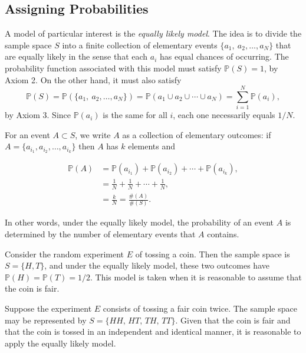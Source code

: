 \documentclass[]{book}
\numberwithin{equation}{chapter}
\numberwithin{figure}{chapter}
\theoremstyle{plain}
\theoremstyle{definition}
\theoremstyle{remark}
\theoremstyle{definition}
\theoremstyle{definition}
\theoremstyle{remark}
\let\BeginKnitrBlock\begin \let\EndKnitrBlock\end
\begin{document}
\subsection{Assigning Probabilities}\label{assigning-probabilities}

A model of particular interest is the \emph{equally likely model}. The
idea is to divide the sample space \(S\) into a finite collection of
elementary events \(\{ a_{1},\ a_{2}, \ldots, a_{N} \}\) that are
equally likely in the sense that each \(a_{i}\) has equal chances of
occurring. The probability function associated with this model must
satisfy \(\mathbb{P}(S)=1\), by Axiom 2. On the other hand, it must also
satisfy \[ \mathbb{P}(S)=\mathbb{P}( \{ a_{1},\
a_{2},\ldots,a_{N} \} )=\mathbb{P}(a_{1}\cup a_{2}\cup\cdots\cup
a_{N})=\sum_{i=1}^{N}\mathbb{P}(a_{i}), \] by Axiom 3. Since
\(\mathbb{P}(a_{i})\) is the same for all \(i\), each one necessarily
equals \(1/N\).

For an event \(A\subset S\), we write \(A\) as a collection of
elementary outcomes: if
\(A = \{ a_{i_{1}}, a_{i_{2}}, \ldots, a_{i_{k}} \}\) then \(A\) has
\(k\) elements and

\begin{align*}
\mathbb{P}(A) & =\mathbb{P}(a_{i_{1}})+\mathbb{P}(a_{i_{2}})+\cdots+\mathbb{P}(a_{i_{k}}),\\
 & =\frac{1}{N}+\frac{1}{N}+\cdots+\frac{1}{N},\\
 & =\frac{k}{N}=\frac{\#(A)}{\#(S)}.
\end{align*}

In other words, under the equally likely model, the probability of an
event \(A\) is determined by the number of elementary events that \(A\)
contains.

\bigskip

\BeginKnitrBlock{example}
\protect\hypertarget{ex:unnamed-chunk-123}{}{\label{ex:unnamed-chunk-123}}Consider
the random experiment \(E\) of tossing a coin. Then the sample space is
\(S=\{H,T\}\), and under the equally likely model, these two outcomes
have \(\mathbb{P}(H)=\mathbb{P}(T)=1/2\). This model is taken when it is
reasonable to assume that the coin is fair.
\EndKnitrBlock{example}

\bigskip

\BeginKnitrBlock{example}
\protect\hypertarget{ex:unnamed-chunk-124}{}{\label{ex:unnamed-chunk-124}}Suppose
the experiment \(E\) consists of tossing a fair coin twice. The sample
space may be represented by \(S=\{HH,\, HT,\, TH,\, TT\}\). Given that
the coin is fair and that the coin is tossed in an independent and
identical manner, it is reasonable to apply the equally likely model.
\EndKnitrBlock{example}
\end{document}

